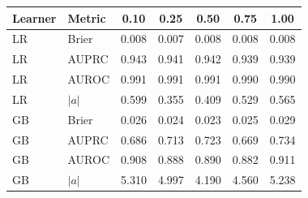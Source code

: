 \begin{tabular}{llccccc}
\toprule
Learner & Metric & 0.10 & 0.25 & 0.50 & 0.75 & 1.00 \\
\midrule
LR & Brier & 0.008 & 0.007 & 0.008 & 0.008 & 0.008 \\
LR & AUPRC & 0.943 & 0.941 & 0.942 & 0.939 & 0.939 \\
LR & AUROC & 0.991 & 0.991 & 0.991 & 0.990 & 0.990 \\
LR & $|a|$ & 0.599 & 0.355 & 0.409 & 0.529 & 0.565 \\
GB & Brier & 0.026 & 0.024 & 0.023 & 0.025 & 0.029 \\
GB & AUPRC & 0.686 & 0.713 & 0.723 & 0.669 & 0.734 \\
GB & AUROC & 0.908 & 0.888 & 0.890 & 0.882 & 0.911 \\
GB & $|a|$ & 5.310 & 4.997 & 4.190 & 4.560 & 5.238 \\
\bottomrule
\end{tabular}
